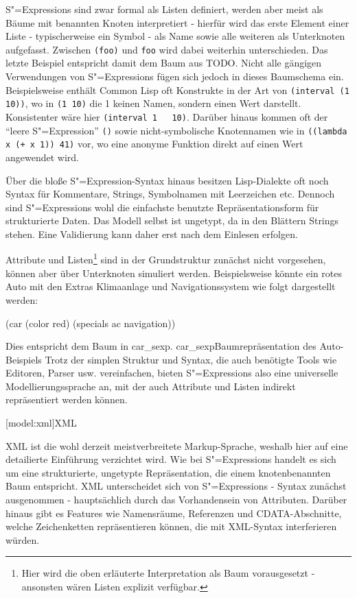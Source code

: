 \documentclass[11pt, a4paper, bibgerm]{scrbook}
\newcommand\icode[1]{\lstinline?#1?}
\newcommand\lsection{}
\newcommand\abb{}
\newcommand\fig{}
\newcommand{\sexp}{S"=Expression}
\newcommand{\sexps}{S"=Expressions}
\begin{document}
\sexps{} sind zwar formal als Listen definiert, werden aber meist als
Bäume mit benannten Knoten interpretiert - hierfür wird das erste
Element einer Liste - typischerweise ein Symbol - als Name sowie alle
weiteren als Unterknoten aufgefasst. Zwischen \icode{(foo)} und
\icode{foo} wird dabei weiterhin unterschieden. Das letzte Beispiel
entspricht damit dem Baum aus \abb{TODO}. Nicht alle gängigen
Verwendungen von \sexps{} fügen sich jedoch in dieses Baumschema
ein. Beispielsweise enthält Common Lisp oft Konstrukte in der Art von
\icode{(interval (1 10))}, wo in \icode{(1 10)} die 1 keinen Namen,
sondern einen Wert darstellt. Konsistenter wäre hier \icode{(interval 1
  10)}. Darüber hinaus kommen oft der ``leere \sexp{}'' \icode{()} sowie
nicht-symbolische Knotennamen wie in \icode{((lambda x (+ x 1)) 41)}
vor, wo eine anonyme Funktion direkt auf einen Wert angewendet wird.

Über die bloße \sexp{}-Syntax hinaus besitzen Lisp-Dialekte oft noch
Syntax für Kommentare, Strings, Symbolnamen mit Leerzeichen
etc. Dennoch sind \sexps{} wohl die einfachste benutzte
Repräsentationsform für strukturierte Daten. Das Modell selbst ist
ungetypt, da in den Blättern Strings stehen. Eine Validierung kann
daher erst nach dem Einlesen erfolgen.

Attribute und Listen\footnote{Hier wird die oben erläuterte
  Interpretation als Baum vorausgesetzt - ansonsten wären Listen
  explizit verfügbar.} sind in der Grundstruktur zunächst nicht
vorgesehen, können aber über Unterknoten simuliert
werden. Beispielsweise könnte ein rotes Auto mit den Extras Klimaanlage
und Navigationssystem wie folgt dargestellt
werden:
\begin{code}
(car
  (color red)
  (specials ac navigation))
\end{code}

Dies entspricht dem Baum in \abb{car_sexp}.
\fig{car_sexp}{Baumrepräsentation des Auto-Beispiels} Trotz der simplen
Struktur und Syntax, die auch benötigte Tools wie Editoren, Parser
usw. vereinfachen, bieten \sexps{} also eine universelle
Modellierungssprache an, mit der auch Attribute und Listen indirekt
repräsentiert werden können.

\lsection[model:xml]{XML}

XML ist die wohl derzeit meistverbreitete Markup-Sprache, weshalb hier
auf eine detailierte Einführung verzichtet wird. Wie bei \sexps{}
handelt es sich um eine strukturierte, ungetypte Repräsentation, die
einem knotenbenannten Baum entspricht. XML unterscheidet sich von
\sexps{} - Syntax zunächst ausgenommen - hauptsächlich durch das
Vorhandensein von Attributen. Darüber hinaus gibt es Features wie
Namensräume, Referenzen und CDATA-Abschnitte, welche Zeichenketten
repräsentieren können, die mit XML-Syntax interferieren würden.
\end{document}
